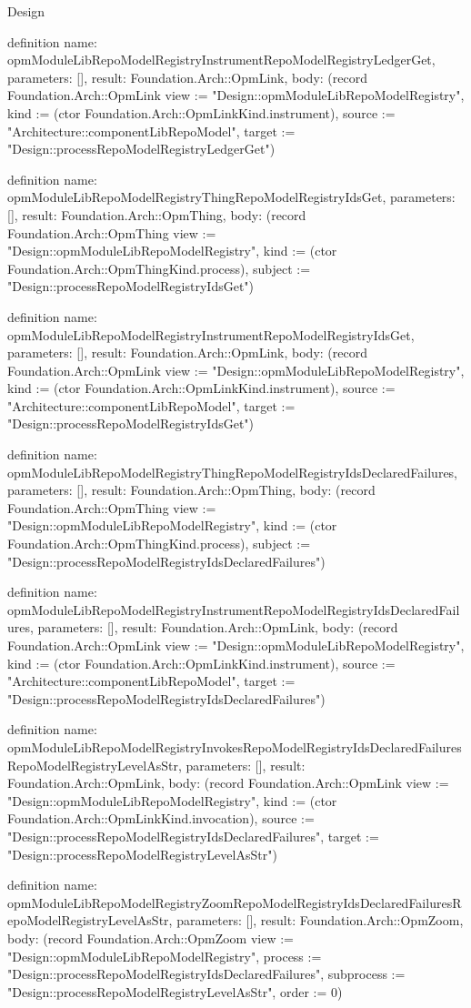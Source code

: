 \begin{lexlean}{Design}
\begin{semanticmodule}
definition{
  name: opmModuleLibRepoModelRegistryInstrumentRepoModelRegistryLedgerGet,
  parameters: [],
  result: Foundation.Arch::OpmLink,
  body: (record Foundation.Arch::OpmLink {view := "Design::opmModuleLibRepoModelRegistry", kind := (ctor Foundation.Arch::OpmLinkKind.instrument), source := "Architecture::componentLibRepoModel", target := "Design::processRepoModelRegistryLedgerGet"})
}

definition{
  name: opmModuleLibRepoModelRegistryThingRepoModelRegistryIdsGet,
  parameters: [],
  result: Foundation.Arch::OpmThing,
  body: (record Foundation.Arch::OpmThing {view := "Design::opmModuleLibRepoModelRegistry", kind := (ctor Foundation.Arch::OpmThingKind.process), subject := "Design::processRepoModelRegistryIdsGet"})
}

definition{
  name: opmModuleLibRepoModelRegistryInstrumentRepoModelRegistryIdsGet,
  parameters: [],
  result: Foundation.Arch::OpmLink,
  body: (record Foundation.Arch::OpmLink {view := "Design::opmModuleLibRepoModelRegistry", kind := (ctor Foundation.Arch::OpmLinkKind.instrument), source := "Architecture::componentLibRepoModel", target := "Design::processRepoModelRegistryIdsGet"})
}

definition{
  name: opmModuleLibRepoModelRegistryThingRepoModelRegistryIdsDeclaredFailures,
  parameters: [],
  result: Foundation.Arch::OpmThing,
  body: (record Foundation.Arch::OpmThing {view := "Design::opmModuleLibRepoModelRegistry", kind := (ctor Foundation.Arch::OpmThingKind.process), subject := "Design::processRepoModelRegistryIdsDeclaredFailures"})
}

definition{
  name: opmModuleLibRepoModelRegistryInstrumentRepoModelRegistryIdsDeclaredFailures,
  parameters: [],
  result: Foundation.Arch::OpmLink,
  body: (record Foundation.Arch::OpmLink {view := "Design::opmModuleLibRepoModelRegistry", kind := (ctor Foundation.Arch::OpmLinkKind.instrument), source := "Architecture::componentLibRepoModel", target := "Design::processRepoModelRegistryIdsDeclaredFailures"})
}

definition{
  name: opmModuleLibRepoModelRegistryInvokesRepoModelRegistryIdsDeclaredFailuresRepoModelRegistryLevelAsStr,
  parameters: [],
  result: Foundation.Arch::OpmLink,
  body: (record Foundation.Arch::OpmLink {view := "Design::opmModuleLibRepoModelRegistry", kind := (ctor Foundation.Arch::OpmLinkKind.invocation), source := "Design::processRepoModelRegistryIdsDeclaredFailures", target := "Design::processRepoModelRegistryLevelAsStr"})
}

definition{
  name: opmModuleLibRepoModelRegistryZoomRepoModelRegistryIdsDeclaredFailuresRepoModelRegistryLevelAsStr,
  parameters: [],
  result: Foundation.Arch::OpmZoom,
  body: (record Foundation.Arch::OpmZoom {view := "Design::opmModuleLibRepoModelRegistry", process := "Design::processRepoModelRegistryIdsDeclaredFailures", subprocess := "Design::processRepoModelRegistryLevelAsStr", order := 0})
}


\end{semanticmodule}
\end{lexlean}
